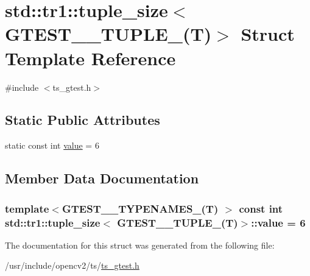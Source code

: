 \hypertarget{structstd_1_1tr1_1_1tuple__size_3_01GTEST__6__TUPLE___07T_08_4}{\section{std\-:\-:tr1\-:\-:tuple\-\_\-size$<$ G\-T\-E\-S\-T\-\_\-\_\-\-T\-U\-P\-L\-E\-\_\-(T)$>$ Struct Template Reference}
\label{structstd_1_1tr1_1_1tuple__size_3_01GTEST__6__TUPLE___07T_08_4}
}


{\ttfamily \#include $<$ts\-\_\-gtest.\-h$>$}

\subsection*{Static Public Attributes}
\begin{DoxyCompactItemize}
\item 
static const int \hyperlink{structstd_1_1tr1_1_1tuple__size_3_01GTEST__6__TUPLE___07T_08_4_a5400701a7dfa80c78b89ff9de5c0271e}{value} = 6
\end{DoxyCompactItemize}


\subsection{Member Data Documentation}
\hypertarget{structstd_1_1tr1_1_1tuple__size_3_01GTEST__6__TUPLE___07T_08_4_a5400701a7dfa80c78b89ff9de5c0271e}{
\subsubsection[{value}]{\setlength{\rightskip}{0pt plus 5cm}template$<$G\-T\-E\-S\-T\-\_\-\_\-\-T\-Y\-P\-E\-N\-A\-M\-E\-S\-\_\-(\-T) $>$ const int {\bf std\-::tr1\-::tuple\-\_\-size}$<$ {\bf G\-T\-E\-S\-T\-\_\-\_\-\-T\-U\-P\-L\-E\-\_\-}({\bf T})$>$\-::value = 6\hspace{0.3cm}{\ttfamily [static]}}}\label{structstd_1_1tr1_1_1tuple__size_3_01GTEST__6__TUPLE___07T_08_4_a5400701a7dfa80c78b89ff9de5c0271e}


The documentation for this struct was generated from the following file\-:\begin{DoxyCompactItemize}
\item 
/usr/include/opencv2/ts/\hyperlink{ts__gtest_8h}{ts\-\_\-gtest.\-h}\end{DoxyCompactItemize}

